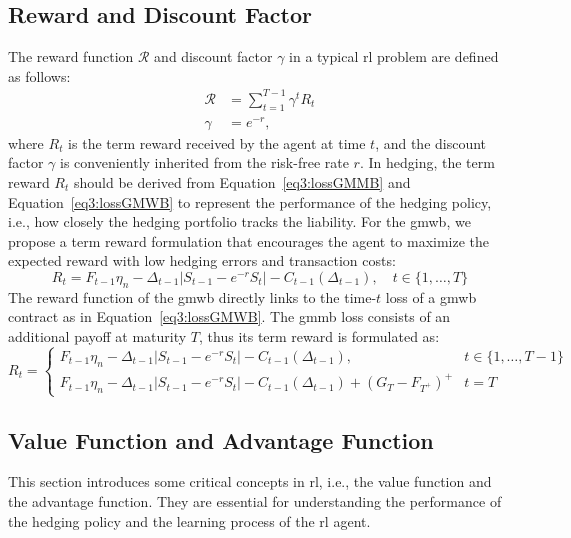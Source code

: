 \subsection{Reward and Discount Factor}
The reward function $\mathcal{R}$ and discount factor $\gamma$ in a typical \gls{rl} problem are defined as follows:
\begin{align}
    \mathcal{R} & = \sum_{t=1}^{T-1} \gamma^t R_t \\
    \gamma      & = e^{-r}, \nonumber
\end{align}
where $R_t$ is the term reward received by the agent at time $t$, and the discount factor $\gamma$ is conveniently inherited from the risk-free rate $r$. 
In hedging, the term reward $R_t$ should be derived from Equation~\eqref{eq3:lossGMMB} and Equation~\eqref{eq3:lossGMWB} to represent the performance of the hedging policy, i.e., how closely the hedging portfolio tracks the liability.
For the \gls{gmwb}, we propose a term reward formulation that encourages the agent to maximize the expected reward with low hedging errors and transaction costs:
\begin{equation} \label{eq3:rewardGMWB}
    R_t = F_{t-1}\eta_n - \Delta_{t-1} |S_{t-1} - e^{-r}S_{t}| - C_{t-1}(\Delta_{t-1}), \quad t \in \{1,\ldots,T \}
\end{equation}
The reward function of the \gls{gmwb} directly links to the time-$t$ loss of a \gls{gmwb} contract as in Equation~\eqref{eq3:lossGMWB}.
The \gls{gmmb} loss consists of an additional payoff at maturity $T$, thus its term reward is formulated as:
\begin{equation} \label{eq3:rewardGMMB}
    R_t = 
    \begin{cases}
    F_{t-1}\eta_n - \Delta_{t-1} |S_{t-1} - e^{-r}S_{t}| - C_{t-1}(\Delta_{t-1}),                         & t\in \{1,\ldots,T-1 \} \\
    F_{t-1}\eta_n - \Delta_{t-1} |S_{t-1} - e^{-r}S_{t}| - C_{t-1}(\Delta_{t-1}) + (G_T - F_{T^+})^+      & t = T
    \end{cases}
\end{equation}

\subsection{Value Function and Advantage Function}

This section introduces some critical concepts in \gls{rl}, i.e., the value function and the advantage function.
They are essential for understanding the performance of the hedging policy and the learning process of the \gls{rl} agent.

